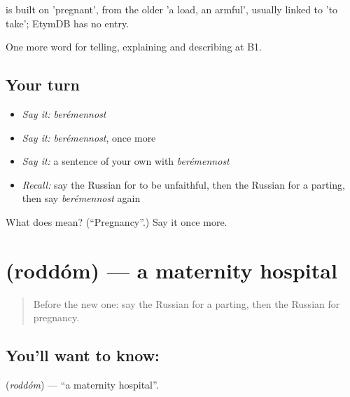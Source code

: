 \begin{cousinweb}
\emph{} is built on \emph{} 'pregnant', from the older \emph{} 'a load, an armful', usually linked to \emph{} 'to take'; EtymDB has no entry.
\end{cousinweb}

\begin{grammarlens}[title={What you've built}]
One more word for telling, explaining and describing at B1.
\end{grammarlens}

\subsection*{Your turn}
\begin{itemize}
\raggedright
  \item \emph{Say it:} \emph{berémennost}
  \item \emph{Say it:} \emph{berémennost}, once more
  \item \emph{Say it:} a sentence of your own with \emph{berémennost}
  \item \emph{Recall:} say the Russian for to be unfaithful, then the Russian for a parting, then say \emph{berémennost} again
\end{itemize}

\begin{tcolorbox}[breakable,colback=teal!4,colframe=teal!35!black,title={Before you move on}]
What does  mean? (\textquotedblleft{}Pregnancy\textquotedblright{}.) Say it once more.
\end{tcolorbox}
\section[\texorpdfstring{\ru{роддом} (roddóm)}{роддом (roddóm)}]{ (roddóm) — a maternity hospital}

\label{lesson:RU-C495-roddom}



\begin{quote}
Before the new one: say the Russian for a parting, then the Russian for pregnancy.
\end{quote}

\subsection*{You'll want to know: }
\textbf{} (\emph{roddóm}) — \textquotedblleft{}a maternity hospital\textquotedblright{}.


